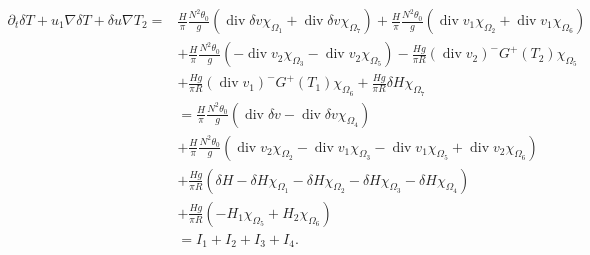 \documentclass[11pt, a4paper, article,reqno,]{amsart}
\theoremstyle{remark}
\DeclareMathOperator{\dive}{div}
\numberwithin{equation}{section}
\begin{document}
\begin{equation}\label{equation_delta_T}
    \begin{aligned}
        \partial_t \delta T + u_1 \nabla \delta T + \delta u \nabla T_{2}  = &\frac{H}{\pi}\frac{N^2 \theta_0}{g}(\dive \delta v \chi_{\Omega_1}  + \dive \delta v \chi_{\Omega_7})  + \frac{H}{\pi}\frac{N^2 \theta_0}{g}(\dive v_1 \chi_{\Omega_2} + \dive v_1 \chi_{\Omega_6} ) \\
        & + \frac{H}{\pi}\frac{N^2 \theta_0}{g}(-\dive v_2 \chi_{\Omega_3} - \dive v_2 \chi_{\Omega_5} ) - \frac{Hg}{\pi R}(\dive v_2)^-G^+(T_2) \chi_{\Omega_5} \\
        & + \frac{Hg}{\pi R}(\dive v_1)^-G^+(T_1)  \chi_{\Omega_6} + \frac{Hg}{\pi R}\delta H\chi_{\Omega_7}\\
        & = \frac{H}{\pi}\frac{N^2 \theta_0}{g} (\dive \delta v - \dive \delta v \chi_{\Omega_4}) \\
        & + \frac{H}{\pi}\frac{N^2 \theta_0}{g}(\dive v_2  \chi_{\Omega_2} - \dive v_1 \chi_{\Omega_3} - \dive v_1 \chi_{\Omega_5} + \dive v_2 \chi_{\Omega_6}) \\
        & + \frac{Hg}{\pi R}(\delta H -  \delta H\chi_{\Omega_1} - \delta H\chi_{\Omega_2} - \delta H\chi_{\Omega_3}- \delta H\chi_{\Omega_4})\\
        & + \frac{Hg}{\pi R}(- H_1\chi_{\Omega_5}  + H_2\chi_{\Omega_6}) \\
        & = I_1 + I_2 + I_3 + I_4.
    \end{aligned}
\end{equation}
\end{document}
